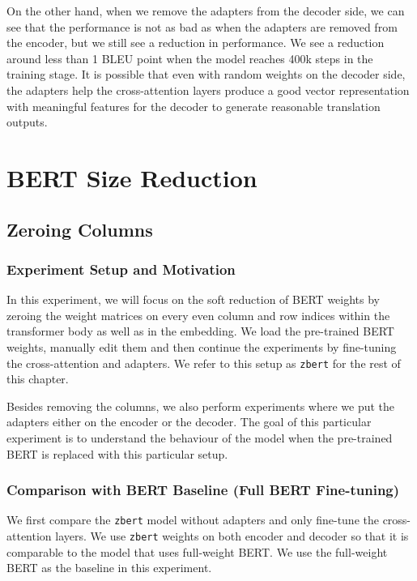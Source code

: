 On the other hand, when we remove the adapters from the decoder side, we can see that the performance is not as bad as when the adapters are removed from the encoder, but we still see a reduction in performance. We see a reduction around less than 1 BLEU point when the model reaches 400k steps in the training stage. It is possible that even with random weights on the decoder side, the adapters help the cross-attention layers produce a good vector representation with meaningful features for the decoder to generate reasonable translation outputs.

\section{BERT Size Reduction}
\subsection{Zeroing Columns}
\subsubsection{Experiment Setup and Motivation}
In this experiment, we will focus on the soft reduction of BERT weights by zeroing the weight matrices on every even column and row indices within the transformer body as well as in the embedding. We load the pre-trained BERT weights, manually edit them and then continue the experiments by fine-tuning the cross-attention and adapters. We refer to this setup as \texttt{zbert} for the rest of this chapter.

Besides removing the columns, we also perform experiments where we put the adapters either on the encoder or the decoder. The goal of this particular experiment is to understand the behaviour of the model when the pre-trained BERT is replaced with this particular setup.

\subsubsection{Comparison with BERT Baseline (Full BERT Fine-tuning)}
We first compare the \texttt{zbert} model without adapters and only fine-tune the cross-attention layers. We use \texttt{zbert} weights on both encoder and decoder so that it is comparable to the model that uses full-weight BERT. We use the full-weight BERT as the baseline in this experiment.

